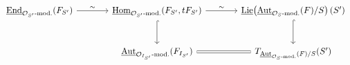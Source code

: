 \[\begin{tikzcd}[column sep=large,row sep=large]
\underline{\operatorname{End}}_{\mathcal O_{S'}\text{-mod.}}(F_{S'}) \arrow[r,"\sim"] &
\underline{\operatorname{Hom}}_{\mathcal O_{S'}\text{-mod.}}(F_{S'},tF_{S'}) \arrow[r,"\sim"] \arrow[d,hook] &
\underline{\operatorname{Lie}}\!\left(\underline{\operatorname{Aut}}_{\mathcal O_S\text{-mod.}}(F)/S\right)(S') \arrow[d,hook]\\
{} &
\underline{\operatorname{Aut}}_{\mathcal O_{I_{S'}}\text{-mod.}}(F_{I_{S'}}) \arrow[r,equal] &
T_{\underline{\operatorname{Aut}}_{\mathcal O_S\text{-mod.}}(F)/S}(S')
\end{tikzcd}\]
